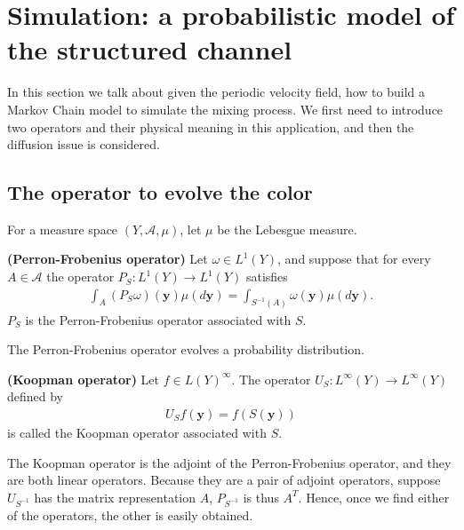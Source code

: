 \section{Simulation: a probabilistic model of the structured channel}
\label{sec:simu}
In this section we talk about given the periodic velocity field, how to build a Markov Chain model to simulate the mixing process. We first need to introduce two operators and their physical meaning in this application, and then the diffusion issue is considered. 
\subsection{The operator to evolve the color}

For a measure space $(Y,\mathcal{A},\mu)$, let $\mu$ be the
Lebesgue measure.  
\begin{definition} {\bfseries (Perron-Frobenius operator)}
Let $\omega \in L^1(Y)$, and suppose that for every $A \in \mathcal{A}$ the operator
$P_S:L^1(Y) \to L^1(Y)$ satisfies
  \begin{eqnarray}
    \int_A (P_S \omega)(\mathbf{y})\mu(d\mathbf{y}) = \int_{S^{-1}(A)} \omega(\mathbf{y})\mu(d\mathbf{y}).
  \end{eqnarray}
$P_S$ is the Perron-Frobenius operator associated with $S$.
\end{definition}
The Perron-Frobenius operator evolves a probability distribution.
\begin{definition} {\bfseries (Koopman operator)}
Let $f \in L(Y)^\infty$. The operator $U_S:L^{\infty}(Y) \to
L^{\infty}(Y) $ defined by
 \begin{eqnarray}
 U_Sf(\mathbf{y}) = f(S(\mathbf{y}))
 \end{eqnarray}
is called the Koopman operator associated with $S$.
\end{definition}
The Koopman operator is the adjoint of the Perron-Frobenius operator, and they are both linear operators. Because they are a pair of adjoint operators, suppose
$U_{S^{-1}}$ has the matrix representation $A$, $P_{S^{-1}}$ is thus $A^T$. Hence, once we find
either of the operators, the other is easily obtained.

